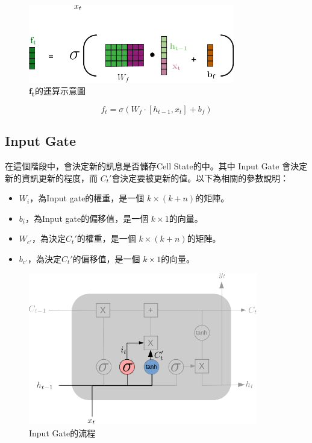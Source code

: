 \begin{figure}[H]
	\centering
	\includegraphics[width=9cm]{./pic/1hRe7Dz4.png}
	\caption{\(\mathbf{f_t}\)的運算示意圖}
	\label{fig:ForgetGateCalculate}
\end{figure}

\begin{equation}
	\label{eqn:ForgetGateCalculate}
	f_t = \sigma(W_f\cdot[h_{t-1},x_t]+b_f)
\end{equation}


\subsection{Input Gate}

在這個階段中，會決定新的訊息是否儲存Cell State的中。其中 Input Gate 會決定新的資訊更新的程度，而 \(C_t'\)會決定要被更新的值。以下為相關的參數說明：


\begin{itemize}

	\item 
		\(W_i\)，為Input gate的權重，是一個 \(k \times (k+n)\)的矩陣。

	\item 
		\(b_i\)，為Input gate的偏移值，是一個 \(k \times 1\)的向量。

	\item 
		\(W_{c'}\)，為決定\(C_t'\)的權重，是一個 \(k \times (k+n)\)的矩陣。

	\item 
		\(b_{c'}\)，為決定\(C_t'\)的偏移值，是一個 \(k \times 1\)的向量。

\end{itemize}


\begin{figure}[H]
	\centering
	\includegraphics[width=10cm]{./pic/Htq3Iron.png}
	\caption{Input Gate的流程}
	\label{fig:InputGate}
\end{figure}


